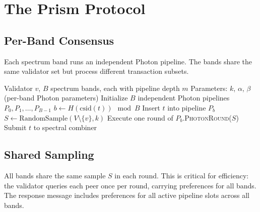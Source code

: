 \documentclass[11pt,a4paper]{article}
\begin{document}
\section{The Prism Protocol}
\label{sec:protocol}

\subsection{Per-Band Consensus}

Each spectrum band runs an independent Photon pipeline. The bands share the same
validator set but process different transaction subsets.

\begin{algorithm}[H]
\caption{Prism Protocol --- Multi-Spectrum Parallel Consensus}
\label{alg:prism-core}
\begin{algorithmic}[1]
\Require Validator $v$, $B$ spectrum bands, each with pipeline depth $m$
\Require Parameters: $k$, $\alpha$, $\beta$ (per-band Photon parameters)
\State Initialize $B$ independent Photon pipelines $P_0, P_1, \ldots, P_{B-1}$
\Loop
    \State {}
        \State $b \gets H(\text{csid}(t)) \mod B$
        \State Insert $t$ into pipeline $P_b$
    \EndFor
    \State {}
    \State $S \gets \text{RandomSample}(V \setminus \{v\}, k)$
        \State Execute one round of $P_b$.\textsc{PhotonRound}($S$)
    \EndFor
    \State {}
            \State Submit $t$ to spectral combiner
        \EndFor
    \EndFor
\EndLoop
\end{algorithmic}
\end{algorithm}

\subsection{Shared Sampling}

All bands share the same sample $S$ in each round. This is critical for efficiency:
the validator queries each peer once per round, carrying preferences for all bands.
The response message includes preferences for all active pipeline slots across all bands.
\end{document}
